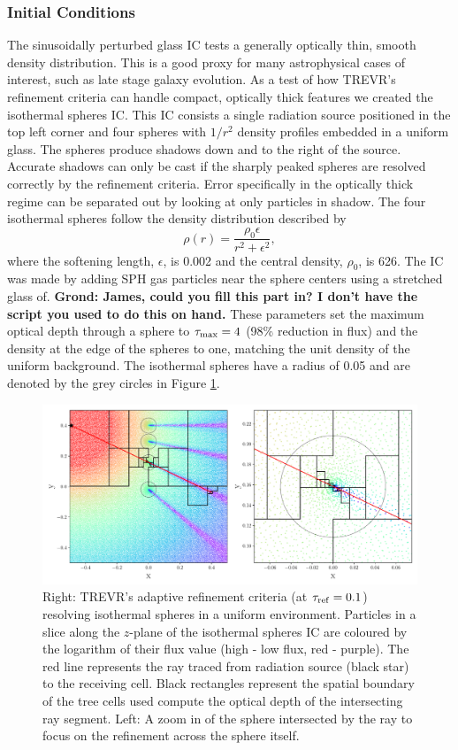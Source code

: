 \documentclass[fleq,usenatbib]{mnras}
\newcommand{\acro}{TREVR}
\newcommand{\comment}[1]{\textbf{\color{red}#1}}
\newcommand{\tr}{\tau_{\rm ref}}
\begin{document}
\subsubsection{Initial Conditions}
The sinusoidally perturbed glass IC tests a generally optically thin, smooth 
density distribution. This is a good proxy for many astrophysical cases of 
interest, such as late stage galaxy evolution. As a test of how \acro{}'s 
refinement criteria can handle compact, optically thick features we created 
the isothermal spheres IC. This IC consists a single radiation source 
positioned in the top left corner and four spheres with $1/r^2$ density 
profiles embedded in a uniform glass. The spheres produce shadows down and to 
the right of the source. Accurate shadows can only be cast if the sharply 
peaked spheres are resolved correctly by the refinement criteria. Error 
specifically in the optically thick regime can be separated out by looking at 
only particles in shadow. The four isothermal spheres follow the density 
distribution described by
\begin{equation}
\rho(r) = \frac{\rho_0 \epsilon}{r^2 + \epsilon^2},
\end{equation}
where the softening length, $\epsilon$, is 0.002 and the central density, 
$\rho_0$, is 626. The IC was made by adding SPH gas particles near the 
sphere centers using a stretched glass of. \comment{Grond: James, could you 
fill this part in? I don't have the script you used to do this on hand.} These 
parameters set the maximum optical depth through a sphere to 
$\tau_{\rm max}=4$ (98\% reduction in flux) and the density at the edge of the 
spheres to one, matching the unit density of the uniform background. The 
isothermal spheres have a radius of 0.05 and are denoted by the grey circles 
in Figure \ref{fig:cellplot}.  
\begin{figure}
\includegraphics[width=1\linewidth]{Figures/cellplot.pdf}
\caption{Right: \acro{}'s adaptive refinement criteria (at $\tr =0.1$) 
resolving isothermal spheres in a uniform environment. Particles in a slice 
along the $z$-plane of the isothermal spheres IC are coloured by the logarithm 
of their flux value (high - low flux, red - purple). The red line represents 
the ray traced from radiation source (black star) to the receiving cell. Black 
rectangles represent the spatial boundary of the tree cells used compute the 
optical depth of the intersecting ray segment. Left: A zoom in of the sphere 
intersected by the ray to focus on the refinement across the sphere itself.}
\label{fig:cellplot}
\end{figure}
\end{document}
